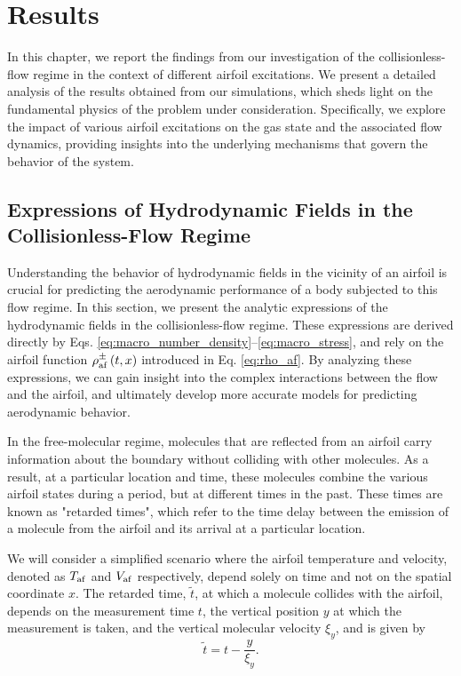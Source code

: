 \chapter{Results}
In this chapter, we report the findings from our investigation of the collisionless-flow regime in the context of different airfoil excitations. We present a detailed analysis of the results obtained from our simulations, which sheds light on the fundamental physics of the problem under consideration. Specifically, we explore the impact of various airfoil excitations on the gas state and the associated flow dynamics, providing insights into the underlying mechanisms that govern the behavior of the system.

\section{Expressions of Hydrodynamic Fields in the Collisionless-Flow Regime}
Understanding the behavior of hydrodynamic fields in the vicinity of an airfoil is crucial for predicting the aerodynamic performance of a body subjected to this flow regime. In this section, we present the analytic expressions of the hydrodynamic fields in the collisionless-flow regime. These expressions are derived directly by Eqs. \ref{eq:macro_number_density}--\ref{eq:macro_stress}, and rely on the airfoil function $\rho_{\mathrm{af}}^\pm\left(t,x\right)$ introduced in Eq. \ref{eq:rho_af}. By analyzing these expressions, we can gain insight into the complex interactions between the flow and the airfoil, and ultimately develop more accurate models for predicting aerodynamic behavior.

In the free-molecular regime, molecules that are reflected from an airfoil carry information about the boundary without colliding with other molecules. As a result, at a particular location and time, these molecules combine the various airfoil states during a period, but at different times in the past. These times are known as "retarded times", which refer to the time delay between the emission of a molecule from the airfoil and its arrival at a particular location.

We will consider a simplified scenario where the airfoil temperature and velocity, denoted as $T_{\mathrm{af}}$ and $V_{\mathrm{af}}$ respectively, depend solely on time and not on the spatial coordinate $x$. The retarded time, $\tilde{t}$, at which a molecule collides with the airfoil, depends on the measurement time $t$, the vertical position $y$ at which the measurement is taken, and the vertical molecular velocity $\xi_y$, and is given by $$\tilde{t}=t-\frac{y}{\xi_y}.$$
